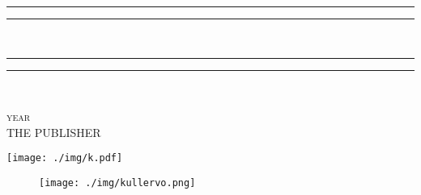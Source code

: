 \documentclass[oneside]{book}
\title{\textfrak{Kalevala}}
\author{\textfrak{koonnut:\\Elias Lönnrot}}
\begin{document}
\begin{titlepage}
    \centering
   
    \textcolor{BrickRed}{\rule{\textwidth}{1.6pt}\vspace*{-\baselineskip}\vspace*{2pt}
    \rule{\textwidth}{0.4pt}}\\[\baselineskip]
    \Huge{}
    \textcolor{BrickRed}{\rule{\textwidth}{0.4pt}\vspace*{-\baselineskip}\vspace{3.2pt}
    \rule{\textwidth}{1.6pt}}\\[\baselineskip]

    \vspace*{2\baselineskip}
    
    \LARGE{}
    
    \vfill
    {\scshape year} \\
    {\large THE PUBLISHER}\par
	\end{titlepage}
	
	\vspace*{5cm}
	\begin{center}
		\texttt{[image: ./img/k.pdf]}
	\end{center}
		
	\begin{figure}[ht]
		\centering
			\texttt{[image: ./img/kullervo.png]}
	\end{figure}
	
	
	
	
	
	
	
	
	
	
\end{document}
